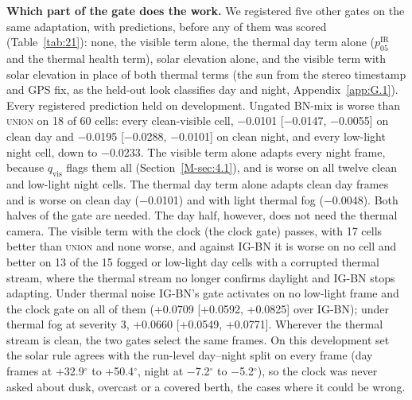 \documentclass[journal,onecolumn]{IEEEtran}
\begin{document}
\textbf{Which part of the gate does the work.} We registered five other gates on the same adaptation, with predictions, before any of them was scored (Table~\ref{tab:21}): none, the visible term alone, the thermal day term alone ($p_{05}^{\mathrm{IR}}$ and the thermal health term), solar elevation alone, and the visible term with solar elevation in place of both thermal terms (the sun from the stereo timestamp and GPS fix, as the held-out look classifies day and night, Appendix~\ref{app:G.1}). Every registered prediction held on development. Ungated BN-mix is worse than \textsc{union} on 18 of 60 cells: every clean-visible cell, $-$0.0101 [$-$0.0147, $-$0.0055] on clean day and $-$0.0195 [$-$0.0288, $-$0.0101] on clean night, and every low-light night cell, down to $-$0.0233. The visible term alone adapts every night frame, because $q_{\mathrm{vis}}$ flags them all (Section~\ref{M-sec:4.1}), and is worse on all twelve clean and low-light night cells. The thermal day term alone adapts clean day frames and is worse on clean day ($-$0.0101) and with light thermal fog ($-$0.0048). Both halves of the gate are needed. The day half, however, does not need the thermal camera. The visible term with the clock (the clock gate) passes, with 17 cells better than \textsc{union} and none worse, and against \mbox{IG-BN} it is worse on no cell and better on 13 of the 15 fogged or low-light day cells with a corrupted thermal stream, where the thermal stream no longer confirms daylight and \mbox{IG-BN} stops adapting. Under thermal noise \mbox{IG-BN}'s gate activates on no low-light frame and the clock gate on all of them (+0.0709 [+0.0592, +0.0825] over \mbox{IG-BN}); under thermal fog at severity 3, +0.0660 [+0.0549, +0.0771]. Wherever the thermal stream is clean, the two gates select the same frames. On this development set the solar rule agrees with the run-level day--night split on every frame (day frames at +32.9$^{\circ}$ to +50.4$^{\circ}$, night at $-$7.2$^{\circ}$ to $-$5.2$^{\circ}$), so the clock was never asked about dusk, overcast or a covered berth, the cases where it could be wrong.
\end{document}
